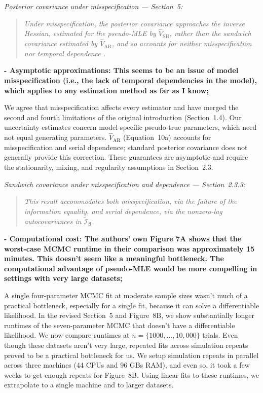 \documentclass[00-main.tex]{subfiles}
\newcommand{\reviewercomment}[1]{\vspace{0.3cm}\textbf{#1}\vspace{0.15cm}}
\newcommand{\manuscriptquote}[1]{\begin{quote}\textit{#1}\end{quote}}
\begin{document}
\emph{Posterior covariance under misspecification --- Section~5:}

\manuscriptquote{Under misspecification, the posterior covariance approaches the inverse Hessian, estimated for the pseudo-MLE by $\widehat{V}_\text{SH}$, rather than the sandwich covariance estimated by $\widehat{V}_\text{AR}$, and so accounts for neither misspecification nor temporal dependence \citep{shaby_open-faced_2014}.}

\reviewercomment{- Asymptotic approximations: This seems to be an issue of model misspecification (i.e., the lack of temporal dependencies in the model), which applies to any estimation method as far as I know;}

We agree that misspecification affects every estimator and have merged the second and fourth limitations of the original introduction (Section~1.4). Our uncertainty estimates concern model-specific pseudo-true parameters, which need not equal generating parameters. $\widehat{V}_\text{AR}$ (Equation~10a) accounts for misspecification and serial dependence; standard posterior covariance does not generally provide this correction. These guarantees are asymptotic and require the stationarity, mixing, and regularity assumptions in Section~2.3.

\emph{Sandwich covariance under misspecification and dependence --- Section~2.3.3:}

\manuscriptquote{This result accommodates both misspecification, via the failure of the information equality, and serial dependence, via the nonzero-lag autocovariances in $\tilde{\mathscr{I}}_{\bm\beta}$.}

\reviewercomment{- Computational cost: The authors' own Figure 7A shows that the worst-case MCMC runtime in their comparison was approximately 15 minutes. This doesn't seem like a meaningful bottleneck. The computational advantage of pseudo-MLE would be more compelling in settings with very large datasets;}

A single four-parameter MCMC fit at moderate sample sizes wasn't much of a practical bottleneck, especially for a single fit, because it can solve a differentiable likelihood. In the revised Section~5 and Figure~8B, we show substantially longer runtimes of the seven-parameter MCMC that doesn't have a differentiable likelihood. We now compare runtimes at $n=\{1000, \dots, 10{,}000\}$ trials. Even though these datasets aren't very large, repeated fits across simulation repeats proved to be a practical bottleneck for us. We setup simulation repeats in parallel across three machines (44 CPUs and 96 GBs RAM), and even so, it took a few weeks to get enough repeats for Figure~8B. Using linear fits to these runtimes, we extrapolate to a single machine and to larger datasets.
\end{document}
